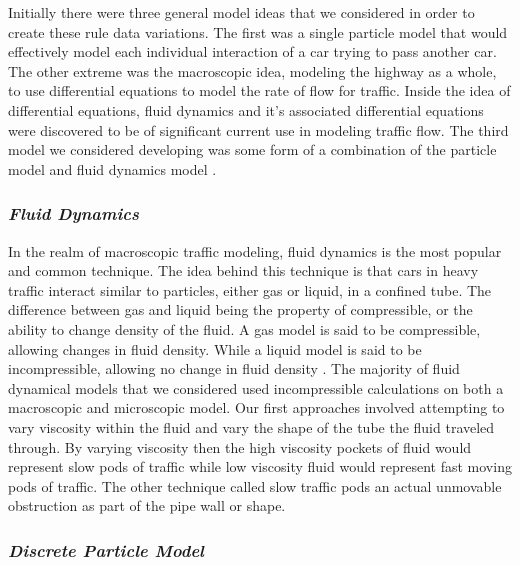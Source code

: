\documentclass{amsart}
\begin{document}
	
	
	Initially there were three general model ideas that we considered in order to create these rule data variations. The first was a single particle model that would effectively model each individual interaction of a car trying to pass another car.  The other extreme was the macroscopic idea, modeling the highway as a whole, to use differential equations to model the rate of flow for traffic.  Inside the idea of differential equations, fluid dynamics and it's associated differential equations were discovered to be of significant current use in modeling traffic flow.  The third model we considered developing was some form of a combination of the particle model and fluid dynamics model \cite{burghout2005}.
		
		\subsubsection{\it Fluid Dynamics}
		In the realm of macroscopic traffic modeling, fluid dynamics is the most popular and common technique.  The idea behind this technique is that cars in heavy traffic interact similar to particles, either gas or liquid, in a confined tube.  
The difference between gas and liquid being the property of compressible, or the ability to change density of the fluid.  A gas model is said to be compressible, allowing changes in  fluid density.  While a liquid model is said to be incompressible, allowing no change in fluid density \cite{stone2007introduction}.  The majority of fluid dynamical models that we considered used incompressible calculations on both a macroscopic and microscopic model.  Our first approaches involved attempting to vary viscosity within the fluid and vary the shape of the tube the fluid traveled through.  By varying viscosity then the high viscosity pockets of fluid would represent slow pods of traffic while low viscosity fluid would represent fast moving pods of traffic.  The other technique called slow traffic pods an actual unmovable obstruction as part of the pipe wall or shape.  
		
		
	
	
	
		
		\subsubsection{\it Discrete Particle Model}
		
\end{document}
